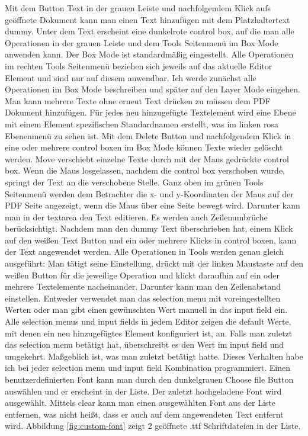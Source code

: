 Mit dem Button Text in der grauen Leiste und nachfolgendem Klick aufs geöffnete Dokument kann man einen Text hinzufügen mit dem Platzhaltertext dummy. Unter dem Text erscheint eine dunkelrote control box, auf die man alle Operationen in der grauen Leiste und dem Tools Seitenmenü im Box Mode anwenden kann. Der Box Mode ist standardmäßig eingestellt. Alle Operationen im rechten Tools Seitenmenü beziehen sich jeweils auf das aktuelle Editor Element und sind nur auf diesem anwendbar. Ich werde zunächst alle Operationen im Box Mode beschreiben und später auf den Layer Mode eingehen. Man kann mehrere Texte ohne erneut Text drücken zu müssen dem PDF Dokument hinzufügen. Für jedes neu hinzugefügte Textelement wird eine Ebene mit einem  Element spezifischen Standardnamen erstellt, was im linken rosa Ebenenmenü zu sehen ist. Mit dem Delete Button und nachfolgendem Klick in eine oder mehrere control boxen im Box Mode können Texte wieder gelöscht werden. Move verschiebt einzelne Texte durch mit der Maus gedrückte control box. Wenn die Maus losgelassen, nachdem die control box verschoben wurde, springt der Text an die verschobene Stelle. Ganz oben im grünen Tools Seitenmenü werden dem Betrachter die x- und y-Koordinaten der Maus auf der PDF Seite angezeigt, wenn die Maus über eine Seite bewegt wird. Darunter kann man in der textarea den Text editieren. Es werden auch Zeilenumbrüche berücksichtigt. Nachdem man den dummy Text überschrieben hat, einem Klick auf den weißen Text Button und ein oder mehrere Klicks in control boxen, kann der Text angewendet werden. Alle Operationen in Tools werden genau gleich ausgeführt: Man tätigt seine Einstellung, drückt mit der linken Maustaste auf den weißen Button für die jeweilige Operation und klickt daraufhin auf ein oder mehrere Textelemente nacheinander. Darunter kann man den Zeilenabstand einstellen. Entweder verwendet man das selection menu mit voreingestellten Werten oder man gibt einen gewünschten Wert manuell in das input field ein. Alle selection menus und input fields in jedem Editor zeigen die default Werte, mit denen ein neu hinzugefügtes Element konfiguriert ist, an. Falls man zuletzt das selection menu betätigt hat, überschreibt es den Wert im input field und umgekehrt. Maßgeblich ist, was man zuletzt betätigt hatte. Dieses Verhalten habe ich bei jeder selection menu und input field Kombination programmiert. Einen benutzerdefinierten Font kann man durch den dunkelgrauen Choose file Button auswählen und er erscheint in der Liste. Der zuletzt hochgeladene Font wird ausgewählt. Mittels clear kann man einen ausgewählten Font aus der Liste entfernen, was nicht heißt, dass er auch auf dem angewendeten Text entfernt wird. Abbildung \ref{fig:custom-font} zeigt 2 geöffnete .ttf Schriftdateien in der Liste.

